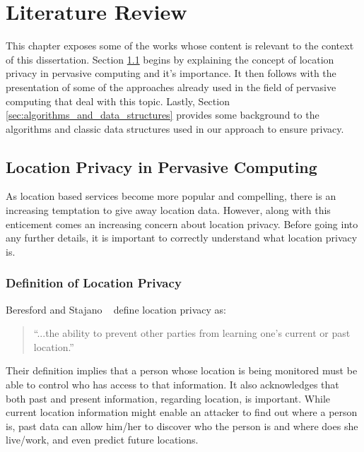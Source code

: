 \chapter{Literature Review}
\label{chap:literature_review}

This chapter exposes some of the works whose content is relevant to
the context of this dissertation. Section
\ref{sec:privacy_pervasive_computing} begins by explaining the concept
of location privacy in pervasive computing and it's importance. It then follows
with the presentation of some of the approaches already used in the
field of pervasive computing that deal with this topic. Lastly, Section
\ref{sec:algorithms_and_data_structures} provides some background to
the algorithms and classic data structures used in our approach to ensure
privacy.

\section{Location Privacy in Pervasive Computing}
\label{sec:privacy_pervasive_computing}

As location based services become more popular and compelling, there
is an increasing temptation to give away location data. However, along
with this enticement comes an increasing concern about location
privacy. Before going into any further details, it is important to
correctly understand what location privacy is.

\subsection{Definition of Location Privacy}
\label{sec:definition_privacy}

Beresford and Stajano ~\cite{1186725} define location privacy as:
\begin{quotation}
  ``...the ability to prevent other parties from learning one's
  current or past location.''
\end{quotation}
Their definition implies that a person whose location is being
monitored must be able to control who has access to that information.
It also acknowledges that both past and present information, regarding
location, is important. While current location information might
enable an attacker to find out where a person is, past data can allow
him/her to discover who the person is and where does she live/work,
and even predict future locations.

